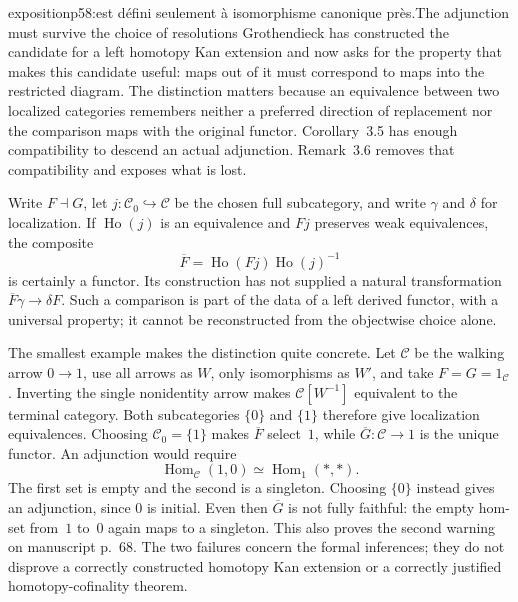 
\begin{dcomment}{exposition}{p58:est défini seulement à isomorphisme canonique près.}{The adjunction must survive the choice of resolutions}
Grothendieck has constructed the candidate for a left homotopy Kan extension and now asks for the property that makes this candidate useful: maps out of it must correspond to maps into the restricted diagram. The distinction matters because an equivalence between two localized categories remembers neither a preferred direction of replacement nor the comparison maps with the original functor. Corollary~3.5 has enough compatibility to descend an actual adjunction. Remark~3.6 removes that compatibility and exposes what is lost.

Write $F\dashv G$, let $j:\mathcal C_0\hookrightarrow\mathcal C$ be the chosen full subcategory, and write $\gamma$ and $\delta$ for localization. If $\operatorname{Ho}(j)$ is an equivalence and $Fj$ preserves weak equivalences, the composite
\[
 \overline F=\operatorname{Ho}(Fj)\operatorname{Ho}(j)^{-1}
\]
is certainly a functor. Its construction has not supplied a natural transformation $\overline F\gamma\to\delta F$. Such a comparison is part of the data of a left derived functor, with a universal property; it cannot be reconstructed from the objectwise choice alone.

The smallest example makes the distinction quite concrete. Let $\mathcal C$ be the walking arrow $0\to1$, use all arrows as $W$, only isomorphisms as $W'$, and take $F=G=1_{\mathcal C}$. Inverting the single nonidentity arrow makes $\mathcal C[W^{-1}]$ equivalent to the terminal category. Both subcategories $\{0\}$ and $\{1\}$ therefore give localization equivalences. Choosing $\mathcal C_0=\{1\}$ makes $\overline F$ select~$1$, while $\overline G:\mathcal C\to1$ is the unique functor. An adjunction would require
\[
 \operatorname{Hom}_{\mathcal C}(1,0)
 \simeq \operatorname{Hom}_{1}(*,*) .
\]
The first set is empty and the second is a singleton. Choosing $\{0\}$ instead gives an adjunction, since $0$ is initial. Even then $\overline G$ is not fully faithful: the empty hom-set from~$1$ to~$0$ again maps to a singleton. This also proves the second warning on manuscript p.~68. The two failures concern the formal inferences; they do not disprove a correctly constructed homotopy Kan extension or a correctly justified homotopy-cofinality theorem.


\end{dcomment}
